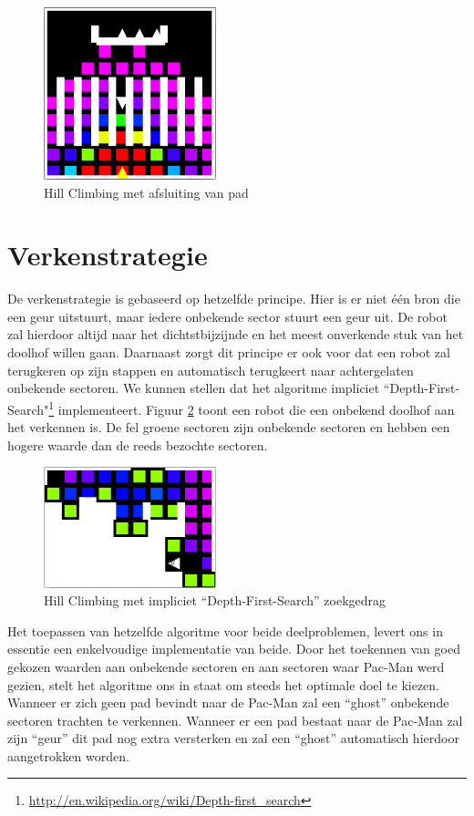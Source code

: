 \documentclass[12pt,a4paper]{report}
\begin{document}
\begin{figure}[htbp]
  \centering
  \includegraphics[width=50mm]{resources/hillclimbing2.png}
  \caption{Hill Climbing met afsluiting van pad}
  \label{fig:hillclimbing2}
\end{figure}

\section{Verkenstrategie}

De verkenstrategie is gebaseerd op hetzelfde principe. Hier is er niet \'e\'en bron die een geur uitstuurt, maar iedere onbekende sector stuurt een geur uit. De robot zal hierdoor altijd naar het dichtstbijzijnde en het meest onverkende stuk van het doolhof willen gaan. Daarnaast zorgt dit principe er ook voor dat een robot zal terugkeren op zijn stappen en automatisch terugkeert naar achtergelaten onbekende sectoren. We kunnen stellen dat het algoritme impliciet ``Depth-First-Search"\footnote{\url{http://en.wikipedia.org/wiki/Depth-first_search}} implementeert. Figuur \ref{fig:dfs} toont een robot die een onbekend doolhof aan het verkennen is. De fel groene sectoren zijn onbekende sectoren en hebben een hogere waarde dan de reeds bezochte sectoren.

\begin{figure}[htbp]
  \centering
  \includegraphics[width=50mm]{resources/dfs.png}
  \caption{Hill Climbing met impliciet ``Depth-First-Search'' zoekgedrag}
  \label{fig:dfs}
\end{figure}

Het toepassen van hetzelfde algoritme voor beide deelproblemen, levert ons in essentie een enkelvoudige implementatie van beide. Door het toekennen van goed gekozen waarden aan onbekende sectoren en aan sectoren waar Pac-Man werd gezien, stelt het algoritme ons in staat om steeds het optimale doel te kiezen. Wanneer er zich geen pad bevindt naar de Pac-Man zal een ``ghost'' onbekende sectoren trachten te verkennen. Wanneer er een pad bestaat naar de Pac-Man zal zijn ``geur'' dit pad nog extra versterken en zal een ``ghost'' automatisch hierdoor aangetrokken worden.
\end{document}
